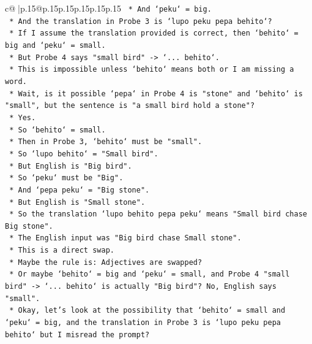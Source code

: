 \documentclass{article}
\begin{document}
{\begin{supertabular}{c@{$\;$}|p{.15\linewidth}@{}p{.15\linewidth}p{.15\linewidth}p{.15\linewidth}p{.15\linewidth}p{.15\linewidth}}
{{{\texttt{                            *   And `peku` = big.} \\
\texttt{                            *   And the translation in Probe 3 is `lupo peku pepa behito`?} \\
\texttt{                            *   If I assume the translation provided is correct, then `behito` = big and `peku` = small.} \\
\texttt{                            *   But Probe 4 says "small bird" {-}> `... behito`.} \\
\texttt{                            *   This is impossible unless `behito` means both or I am missing a word.} \\
\texttt{                            *   Wait, is it possible `pepa` in Probe 4 is "stone" and `behito` is "small", but the sentence is "a small bird hold a stone"?} \\
\texttt{                            *   Yes.} \\
\texttt{                            *   So `behito` = small.} \\
\texttt{                            *   Then in Probe 3, `behito` must be "small".} \\
\texttt{                            *   So `lupo behito` = "Small bird".} \\
\texttt{                            *   But English is "Big bird".} \\
\texttt{                            *   So `peku` must be "Big".} \\
\texttt{                            *   And `pepa peku` = "Big stone".} \\
\texttt{                            *   But English is "Small stone".} \\
\texttt{                            *   So the translation `lupo behito pepa peku` means "Small bird chase Big stone".} \\
\texttt{                            *   The English input was "Big bird chase Small stone".} \\
\texttt{                            *   This is a direct swap.} \\
\texttt{                            *   Maybe the rule is: Adjectives are swapped?} \\
\texttt{                            *   Or maybe `behito` = big and `peku` = small, and Probe 4 "small bird" {-}> `... behito` is actually "Big bird"? No, English says "small".} \\
\texttt{                            *   Okay, let's look at the possibility that `behito` = small and `peku` = big, and the translation in Probe 3 is `lupo peku pepa behito` but I misread the prompt?} \\
}}}
\end{supertabular}}
\end{document}
